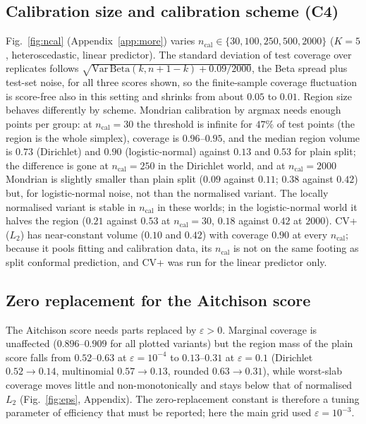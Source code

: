 \subsection{Calibration size and calibration scheme (C4)}
Fig.~\ref{fig:ncal} (Appendix~\ref{app:more}) varies $n_{\mathrm{cal}}\in\{30,100,250,500,2000\}$ ($K=5$, heteroscedastic, linear predictor). The standard deviation of test coverage over replicates follows $\sqrt{\mathrm{Var}\,\mathrm{Beta}(k,n+1-k)+0.09/2000}$, the Beta spread plus test-set noise, for all three scores shown, so the finite-sample coverage fluctuation is score-free also in this setting and shrinks from about $0.05$ to $0.01$. Region size behaves differently by scheme. Mondrian calibration by argmax needs enough points per group: at $n_{\mathrm{cal}}=30$ the threshold is infinite for $47\%$ of test points (the region is the whole simplex), coverage is $0.96$--$0.95$, and the median region volume is $0.73$ (Dirichlet) and $0.90$ (logistic-normal) against $0.13$ and $0.53$ for plain split; the difference is gone at $n_{\mathrm{cal}}=250$ in the Dirichlet world, and at $n_{\mathrm{cal}}=2000$ Mondrian is slightly smaller than plain split ($0.09$ against $0.11$; $0.38$ against $0.42$) but, for logistic-normal noise, not than the normalised variant. The locally normalised variant is stable in $n_{\mathrm{cal}}$ in these worlds; in the logistic-normal world it halves the region ($0.21$ against $0.53$ at $n_{\mathrm{cal}}=30$, $0.18$ against $0.42$ at $2000$). CV+ ($L_2$) has near-constant volume ($0.10$ and $0.42$) with coverage $0.90$ at every $n_{\mathrm{cal}}$; because it pools fitting and calibration data, its $n_{\mathrm{cal}}$ is not on the same footing as split conformal prediction, and CV+ was run for the linear predictor only.

\subsection{Zero replacement for the Aitchison score}
The Aitchison score needs parts replaced by $\varepsilon>0$. Marginal coverage is unaffected ($0.896$--$0.909$ for all plotted variants) but the region mass of the plain score falls from $0.52$--$0.63$ at $\varepsilon=10^{-4}$ to $0.13$--$0.31$ at $\varepsilon=0.1$ (Dirichlet $0.52\to0.14$, multinomial $0.57\to0.13$, rounded $0.63\to0.31$), while worst-slab coverage moves little and non-monotonically and stays below that of normalised $L_2$ (Fig.~\ref{fig:eps}, Appendix). The zero-replacement constant is therefore a tuning parameter of efficiency that must be reported; here the main grid used $\varepsilon=10^{-3}$.

